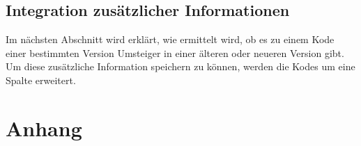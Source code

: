 \subsection{Integration zusätzlicher Informationen}

Im nächsten Abschnitt wird erklärt, wie ermittelt wird, ob es zu einem Kode einer bestimmten Version Umsteiger in einer älteren oder neueren Version gibt. Um diese zusätzliche Information speichern zu können, werden die Kodes um eine Spalte erweitert. 




\appendix
\section*{Anhang}




